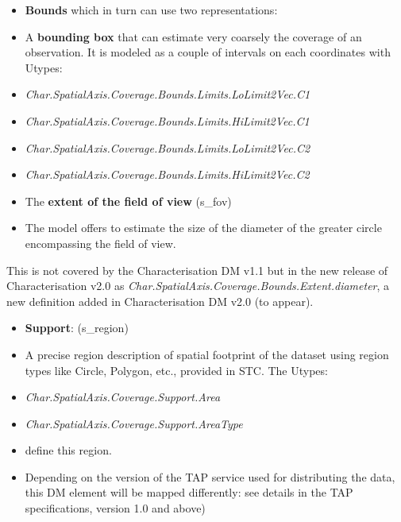 \documentclass[11pt,a4paper]{ivoa}
\begin{document}
\begin{itemize}
\item \textbf{Bounds} which in turn can use two representations:

\item[a)] A \textbf{bounding box} that can estimate very coarsely the coverage of an observation.  It is modeled as a couple of
intervals on each coordinates with Utypes:

\item[ ] \emph{Char.SpatialAxis.Coverage.Bounds.Limits.LoLimit2Vec.C1}

\item[ ] \emph{Char.SpatialAxis.Coverage.Bounds.Limits.HiLimit2Vec.C1}

\item[ ] \emph{Char.SpatialAxis.Coverage.Bounds.Limits.LoLimit2Vec.C2}

\item[ ] \emph{Char.SpatialAxis.Coverage.Bounds.Limits.HiLimit2Vec.C2}

\item[b)] The \textbf{extent of the field of view} (s\_fov)

\item[ ] The model offers to estimate the size of the diameter of the greater circle encompassing the field of view.
\end{itemize}

This is not covered by the Characterisation DM v1.1 but in the new release of Characterisation v2.0 as
\emph{Char.SpatialAxis.Coverage.Bounds.Extent.diameter}, a new definition added in Characterisation DM v2.0 (to appear).

\begin{itemize}
\item \textbf{Support}: (s\_region)

\item[ ] A precise region description of spatial footprint of the dataset using region types like Circle, Polygon, etc., provided
in STC.  The Utypes:

\item[ ] \emph{Char.SpatialAxis.Coverage.Support.Area}

\item[ ] \emph{Char.SpatialAxis.Coverage.Support.AreaType}

\item[ ] define this region.

\item[ ] Depending on the version of the TAP service used for distributing the data, this DM element will be mapped differently:
see details in the TAP specifications, version 1.0 and above)
\end{itemize}
\end{document}
